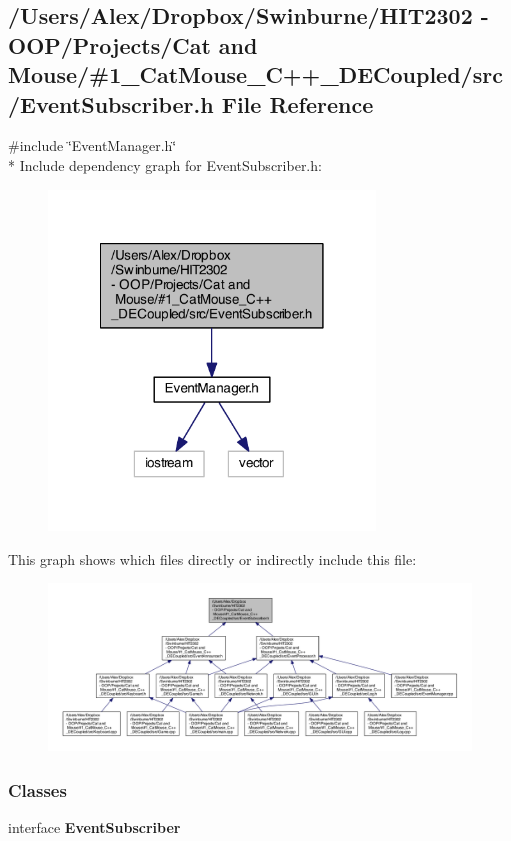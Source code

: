 \subsection{/\-Users/\-Alex/\-Dropbox/\-Swinburne/\-H\-I\-T2302 -\/ O\-O\-P/\-Projects/\-Cat and Mouse/\#1\-\_\-\-Cat\-Mouse\-\_\-\-C++\-\_\-\-D\-E\-Coupled/src/\-Event\-Subscriber.h File Reference}
\label{_event_subscriber_8h}
{\ttfamily \#include \char`\"{}Event\-Manager.\-h\char`\"{}}\\*
Include dependency graph for Event\-Subscriber.\-h\-:
\nopagebreak
\begin{figure}[H]
\begin{center}
\leavevmode
\includegraphics[width=246pt]{_event_subscriber_8h__incl}
\end{center}
\end{figure}
This graph shows which files directly or indirectly include this file\-:
\nopagebreak
\begin{figure}[H]
\begin{center}
\leavevmode
\includegraphics[width=350pt]{_event_subscriber_8h__dep__incl}
\end{center}
\end{figure}
\subsubsection*{Classes}
\begin{DoxyCompactItemize}
\item 
interface {\bf Event\-Subscriber}
\end{DoxyCompactItemize}
